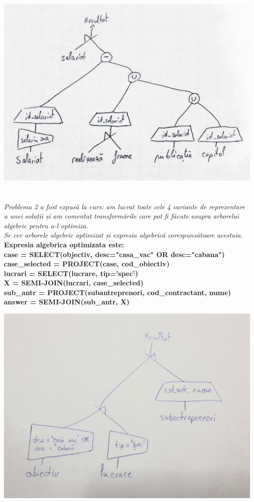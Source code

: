 \documentclass[a4paper,12pt]{article}
\begin{document}
		\includegraphics[scale=0.3]{ex_2_tree.jpg}
		
	
	\section{}
		\textit{Problema 2 a fost expusă la curs: am lucrat toate cele 4 variante de reprezentare a unei soluții și am comentat transformările care pot fi făcute asupra arborelui algebric pentru a-l optimiza.\\
		Se cer arborele algebric optimizat și expresia algebrică corespunzătoare acestuia.\\}
		\newline
		\textbf{Expresia algebrica optimizata este:\\
		case = SELECT(objectiv, desc="casa\_vac" OR desc="cabana")\\
		case\_selected = PROJECT(case, cod\_obiectiv)\\
		lucrari = SELECT(lucrare, tip='spec')\\
		X = SEMI-JOIN(lucrari, case\_selected)\\
		sub\_antr = PROJECT(subantreprenori, cod\_contractant, nume)\\
		answer = SEMI-JOIN(sub\_antr, X)\\}	
		
		\includegraphics[scale=0.3]{ex_3_tree.jpg}
		
\end{document}

